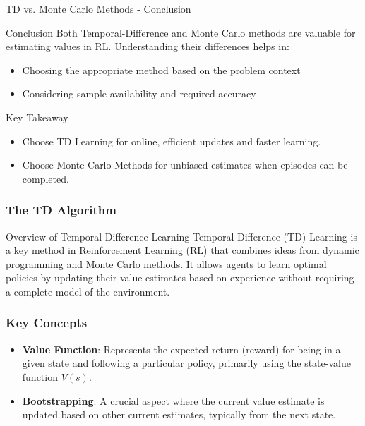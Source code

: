 \documentclass[aspectratio=169]{beamer}
\begin{document}
\begin{frame}[fragile]{TD vs. Monte Carlo Methods - Conclusion}
    \begin{block}{Conclusion}
        Both Temporal-Difference and Monte Carlo methods are valuable for estimating values in RL. Understanding their differences helps in:
        \begin{itemize}
            \item Choosing the appropriate method based on the problem context
            \item Considering sample availability and required accuracy
        \end{itemize}
    \end{block}
    \begin{block}{Key Takeaway}
        \begin{itemize}
            \item Choose TD Learning for online, efficient updates and faster learning.
            \item Choose Monte Carlo Methods for unbiased estimates when episodes can be completed.
        \end{itemize}
    \end{block}
\end{frame}

\begin{frame}[fragile]
    \frametitle{The TD Algorithm}
    \begin{block}{Overview of Temporal-Difference Learning}
        Temporal-Difference (TD) Learning is a key method in Reinforcement Learning (RL) that combines ideas from dynamic programming and Monte Carlo methods. It allows agents to learn optimal policies by updating their value estimates based on experience without requiring a complete model of the environment.
    \end{block}
\end{frame}

\begin{frame}[fragile]
    \frametitle{Key Concepts}
    \begin{itemize}
        \item \textbf{Value Function}: Represents the expected return (reward) for being in a given state and following a particular policy, primarily using the state-value function \( V(s) \).
        \item \textbf{Bootstrapping}: A crucial aspect where the current value estimate is updated based on other current estimates, typically from the next state.
    \end{itemize}
\end{frame}
\end{document}
